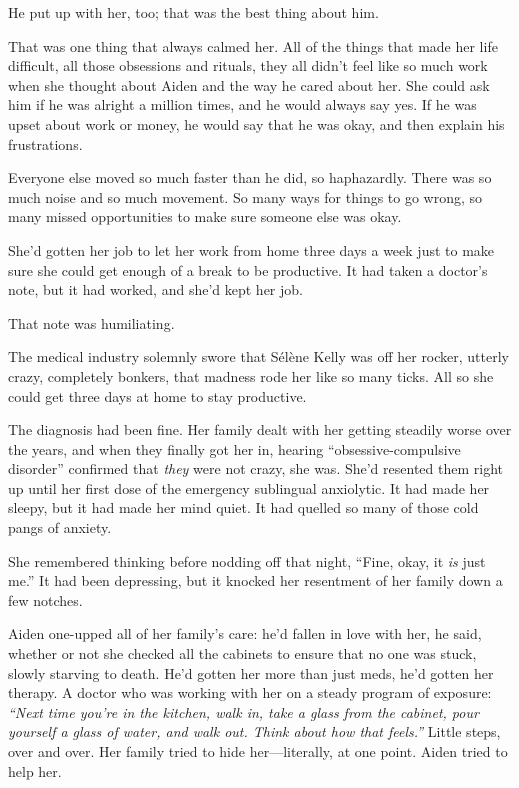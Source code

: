 He put up with her, too; that was the best thing about him.

That was one thing that always calmed her. All of the things that made her life difficult, all those obsessions and rituals, they all didn't feel like so much work when she thought about Aiden and the way he cared about her. She could ask him if he was alright a million times, and he would always say yes. If he was upset about work or money, he would say that he was okay, and then explain his frustrations.

Everyone else moved so much faster than he did, so haphazardly. There was so much noise and so much movement. So many ways for things to go wrong, so many missed opportunities to make sure someone else was okay.

She'd gotten her job to let her work from home three days a week just to make sure she could get enough of a break to be productive. It had taken a doctor's note, but it had worked, and she'd kept her job.

That note was humiliating.

The medical industry solemnly swore that Sélène Kelly was off her rocker, utterly crazy, completely bonkers, that madness rode her like so many ticks. All so she could get three days at home to stay productive.

The diagnosis had been fine. Her family dealt with her getting steadily worse over the years, and when they finally got her in, hearing ``obsessive-compulsive disorder'' confirmed that \emph{they} were not crazy, she was. She'd resented them right up until her first dose of the emergency sublingual anxiolytic. It had made her sleepy, but it had made her mind quiet. It had quelled so many of those cold pangs of anxiety.

She remembered thinking before nodding off that night, ``Fine, okay, it \emph{is} just me.'' It had been depressing, but it knocked her resentment of her family down a few notches.

Aiden one-upped all of her family's care: he'd fallen in love with her, he said, whether or not she checked all the cabinets to ensure that no one was stuck, slowly starving to death. He'd gotten her more than just meds, he'd gotten her therapy. A doctor who was working with her on a steady program of exposure: \emph{``Next time you're in the kitchen, walk in, take a glass from the cabinet, pour yourself a glass of water, and walk out. Think about how that feels.''} Little steps, over and over. Her family tried to hide her---literally, at one point. Aiden tried to help her.

